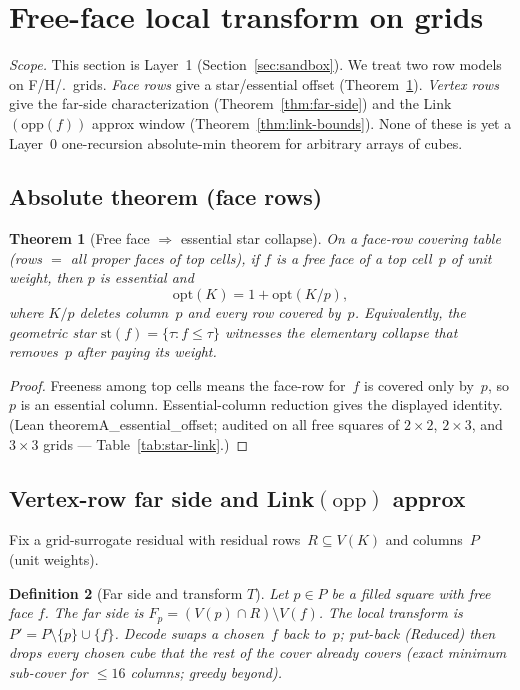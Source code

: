 \documentclass[11pt]{article}
\newtheorem{theorem}{Theorem}
\newtheorem{definition}[theorem]{Definition}
\begin{document}
\section{Free-face local transform on grids}
\label{sec:main}

\textit{Scope.}  This section is Layer~1 (Section~\ref{sec:sandbox}).  We treat
two row models on F/H/.\ grids.  \emph{Face rows} give a star/essential offset
(Theorem~\ref{thm:face-star}).  \emph{Vertex rows} give the far-side
characterization (Theorem~\ref{thm:far-side}) and the Link$(\mathrm{opp}(f))$
approx window (Theorem~\ref{thm:link-bounds}).  None of these is yet a Layer~0
one-recursion absolute-min theorem for arbitrary arrays of cubes.

\subsection{Absolute theorem (face rows)}
\label{sec:face-star}

\begin{theorem}[Free face $\Rightarrow$ essential star collapse]
\label{thm:face-star}
On a face-row covering table (rows $=$ all proper faces of top cells), if $f$ is
a free face of a top cell~$p$ of unit weight, then $p$ is essential and
\[
\mathrm{opt}(K)=1+\mathrm{opt}(K/p),
\]
where $K/p$ deletes column~$p$ and every row covered by~$p$.  Equivalently, the
geometric star $\mathrm{st}(f)=\{\tau:f\le\tau\}$ witnesses the elementary
collapse that removes~$p$ after paying its weight.
\end{theorem}

\begin{proof}
Freeness among top cells means the face-row for~$f$ is covered only by~$p$, so
$p$ is an essential column.  Essential-column reduction gives the displayed
identity.  (Lean \textsf{theoremA\_essential\_offset}; audited on all free
squares of $2\times2$, $2\times3$, and $3\times3$ grids ---
Table~\ref{tab:star-link}.)
\end{proof}

\subsection{Vertex-row far side and Link$(\mathrm{opp})$ approx}
\label{sec:vertex-link}

Fix a grid-surrogate residual with residual rows~$R\subseteq V(K)$ and
columns~$P$ (unit weights).

\begin{definition}[Far side and transform $T$]
\label{def:far-side}
Let $p\in P$ be a filled square with free face $f$.  The \emph{far side} is
$F_p=(V(p)\cap R)\setminus V(f)$.  The local transform is
$P'=P\setminus\{p\}\cup\{f\}$.  \emph{Decode} swaps a chosen~$f$ back to~$p$;
\emph{put-back} (\textsf{Reduced}) then drops every chosen cube that the rest of
the cover already covers (exact minimum sub-cover for $\le 16$ columns; greedy
beyond).
\end{definition}
\end{document}

